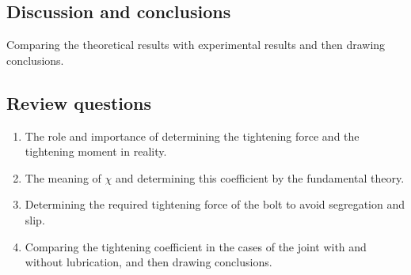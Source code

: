 \subsection{Discussion and conclusions}
Comparing the theoretical results with experimental results and then drawing conclusions.
\subsection{Review questions}
\begin{enumerate}
	\item The role and importance of determining the tightening force and the tightening	moment in reality.\\
	\item The meaning of $ \chi $ and determining this coefficient by the fundamental theory.\\
	\item Determining the required tightening force of the bolt to avoid segregation and slip.\\
	\item Comparing the tightening coefficient in the cases of the joint with and without lubrication, and then drawing conclusions.\\
\end{enumerate}
